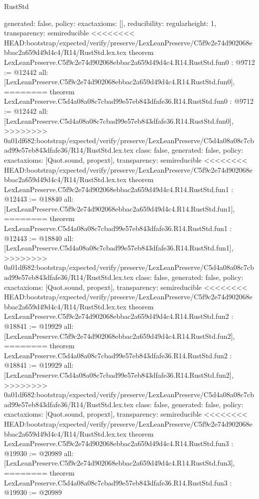\begin{lexlean}{RustStd}
\begin{coremodule}
{\begin{coremodule}
{{{  generated: false,
  policy: exact{axioms: []},
  reducibility: regular{height: 1},
  transparency: semireducible
}
<<<<<<<< HEAD:bootstrap/expected/verify/preserve/LexLeanPreserve/C5f9c2e74d902068ebbac2a659d49d4c4/R14/RustStd.lex.tex
theorem LexLeanPreserve.C5f9c2e74d902068ebbac2a659d49d4c4.R14.RustStd.fun0 : @9712 := @12442 {
  all: [LexLeanPreserve.C5f9c2e74d902068ebbac2a659d49d4c4.R14.RustStd.fun0],
========
theorem LexLeanPreserve.C5d4a08a08c7cbad99e57eb843dfafe36.R14.RustStd.fun0 : @9712 := @12442 {
  all: [LexLeanPreserve.C5d4a08a08c7cbad99e57eb843dfafe36.R14.RustStd.fun0],
>>>>>>>> 0a01df682:bootstrap/expected/verify/preserve/LexLeanPreserve/C5d4a08a08c7cbad99e57eb843dfafe36/R14/RustStd.lex.tex
  class: false,
  generated: false,
  policy: exact{axioms: [Quot.sound, propext]},
  transparency: semireducible
}
<<<<<<<< HEAD:bootstrap/expected/verify/preserve/LexLeanPreserve/C5f9c2e74d902068ebbac2a659d49d4c4/R14/RustStd.lex.tex
theorem LexLeanPreserve.C5f9c2e74d902068ebbac2a659d49d4c4.R14.RustStd.fun1 : @12443 := @18840 {
  all: [LexLeanPreserve.C5f9c2e74d902068ebbac2a659d49d4c4.R14.RustStd.fun1],
========
theorem LexLeanPreserve.C5d4a08a08c7cbad99e57eb843dfafe36.R14.RustStd.fun1 : @12443 := @18840 {
  all: [LexLeanPreserve.C5d4a08a08c7cbad99e57eb843dfafe36.R14.RustStd.fun1],
>>>>>>>> 0a01df682:bootstrap/expected/verify/preserve/LexLeanPreserve/C5d4a08a08c7cbad99e57eb843dfafe36/R14/RustStd.lex.tex
  class: false,
  generated: false,
  policy: exact{axioms: [Quot.sound, propext]},
  transparency: semireducible
}
<<<<<<<< HEAD:bootstrap/expected/verify/preserve/LexLeanPreserve/C5f9c2e74d902068ebbac2a659d49d4c4/R14/RustStd.lex.tex
theorem LexLeanPreserve.C5f9c2e74d902068ebbac2a659d49d4c4.R14.RustStd.fun2 : @18841 := @19929 {
  all: [LexLeanPreserve.C5f9c2e74d902068ebbac2a659d49d4c4.R14.RustStd.fun2],
========
theorem LexLeanPreserve.C5d4a08a08c7cbad99e57eb843dfafe36.R14.RustStd.fun2 : @18841 := @19929 {
  all: [LexLeanPreserve.C5d4a08a08c7cbad99e57eb843dfafe36.R14.RustStd.fun2],
>>>>>>>> 0a01df682:bootstrap/expected/verify/preserve/LexLeanPreserve/C5d4a08a08c7cbad99e57eb843dfafe36/R14/RustStd.lex.tex
  class: false,
  generated: false,
  policy: exact{axioms: [Quot.sound, propext]},
  transparency: semireducible
}
<<<<<<<< HEAD:bootstrap/expected/verify/preserve/LexLeanPreserve/C5f9c2e74d902068ebbac2a659d49d4c4/R14/RustStd.lex.tex
theorem LexLeanPreserve.C5f9c2e74d902068ebbac2a659d49d4c4.R14.RustStd.fun3 : @19930 := @20989 {
  all: [LexLeanPreserve.C5f9c2e74d902068ebbac2a659d49d4c4.R14.RustStd.fun3],
========
theorem LexLeanPreserve.C5d4a08a08c7cbad99e57eb843dfafe36.R14.RustStd.fun3 : @19930 := @20989 {
}}}}}}}
\end{coremodule}}
\end{coremodule}
\end{lexlean}
